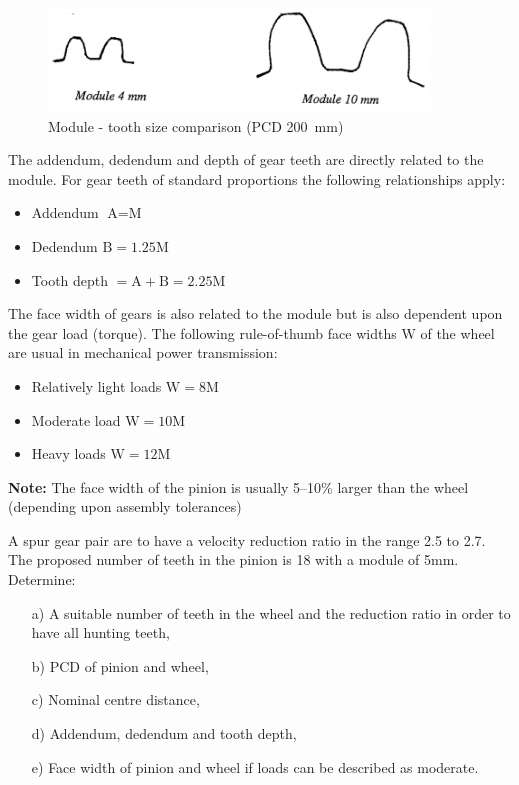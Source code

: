 \begin{figure}[h!]
  \center
  \includegraphics[width=0.9\textwidth]{figs/fig7.png}
  \caption{Module - tooth size comparison (PCD \SI{200}{\milli\metre})}
  \label{fig-7}
\end{figure}

The addendum, dedendum and depth of gear teeth are directly related to the module. For gear teeth of standard proportions the following relationships apply:

\begin{itemize}
  \item Addendum $\text{A} = \text{M}$
  \item Dedendum $\text{B} = 1.25\text{M}$
  \item Tooth depth $=\text{A}+\text{B}=2.25\text{M}$
\end{itemize}

The face width of gears is also related to the module but is also dependent upon the gear load (torque). The following rule-of-thumb face widths $\text{W}$ of the wheel are usual in mechanical power transmission:

\begin{itemize}
  \item Relatively light loads $\text{W}=8\text{M}$
  \item Moderate load $\text{W}=10\text{M}$
  \item Heavy loads $\text{W}=12\text{M}$
\end{itemize}

\textbf{Note:} The face width of the pinion is usually 5--10\% larger than the wheel (depending upon assembly tolerances)

A spur gear pair are to have a velocity reduction ratio in the range 2.5 to 2.7. The proposed number of teeth in the pinion is 18 with a module of 5mm. Determine:

\begin{enumerate}
  \item[a)] A suitable number of teeth in the wheel and the reduction ratio in order to have all hunting teeth,
  \item[b)] PCD of pinion and wheel,
  \item[c)] Nominal centre distance,
  \item[d)] Addendum, dedendum and tooth depth,
  \item[e)] Face width of pinion and wheel if loads can be described as moderate.
\end{enumerate}

